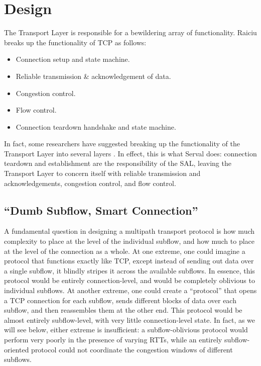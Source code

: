 \section{Design}
\label{sec:design}

The Transport Layer is responsible for a bewildering array of functionality. Raiciu breaks up the functionality of TCP as follows: \cite{raiciu2012hard}

\begin{itemize}
  \item Connection setup and state machine.
  \item Reliable transmission \& acknowledgement of data.
  \item Congestion control.
  \item Flow control.
  \item Connection teardown handshake and state machine.
\end{itemize}

In fact, some researchers have suggested breaking up the functionality of the Transport Layer into several layers \cite{ford2008breaking}. In effect, this is what Serval does: connection teardown and establishment are the responsibility of the SAL, leaving the Transport Layer to concern itself with reliable transmission and acknowledgements, congestion control, and flow control.

\subsection{``Dumb Subflow, Smart Connection''}
A fundamental question in designing a multipath transport protocol is how much complexity to place at the level of the individual subflow, and how much to place at the level of the connection as a whole. At one extreme, one could imagine a protocol that functions exactly like TCP, except instead of sending out data over a single subflow, it blindly stripes it across the available subflows. In essence, this protocol would be entirely connection-level, and would be completely oblivious to individual subflows. At another extreme, one could create a ``protocol'' that opens a TCP connection for each subflow, sends different blocks of data over each subflow, and then reassembles them at the other end. This protocol would be almost entirely subflow-level, with very little connection-level state. In fact, as we will see below, either extreme is insufficient: a subflow-oblivious protocol would perform very poorly in the presence of varying RTTs, while an entirely subflow-oriented protocol could not coordinate the congestion windows of different subflows.

